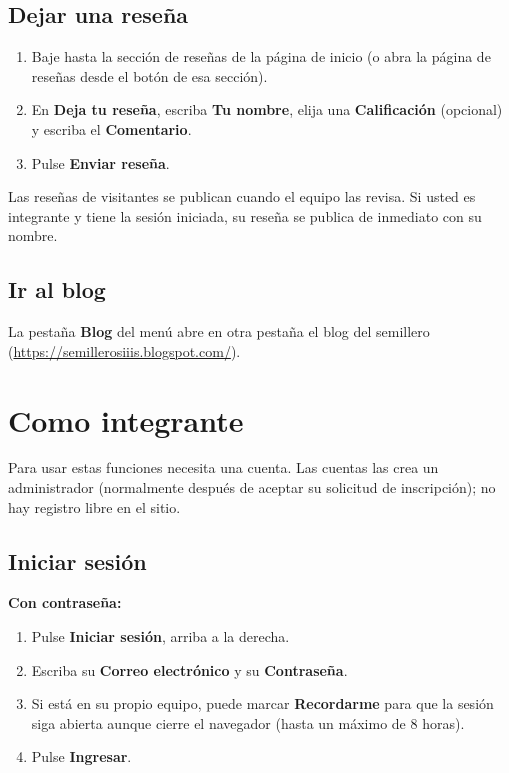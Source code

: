 \documentclass[11pt,a4paper]{article}
\newcommand{\boton}[1]{\textbf{\textcolor{siiisazul}{#1}}}
\begin{document}

\subsection{Dejar una rese\~na}
\begin{enumerate}
  \item Baje hasta la secci\'on de rese\~nas de la p\'agina de inicio (o abra la p\'agina de rese\~nas desde el bot\'on
    de esa secci\'on).
  \item En \boton{Deja tu rese\~na}, escriba \textbf{Tu nombre}, elija una \textbf{Calificaci\'on} (opcional) y escriba
    el \textbf{Comentario}.
  \item Pulse \boton{Enviar rese\~na}.
\end{enumerate}
Las rese\~nas de visitantes se publican cuando el equipo las revisa. Si usted es integrante y tiene la sesi\'on
iniciada, su rese\~na se publica de inmediato con su nombre.


\subsection{Ir al blog}
La pesta\~na \boton{Blog} del men\'u abre en otra pesta\~na el blog del semillero (\url{https://semillerosiiis.blogspot.com/}).

\section{Como integrante}

Para usar estas funciones necesita una cuenta. Las cuentas las crea un administrador (normalmente despu\'es de aceptar
su solicitud de inscripci\'on); no hay registro libre en el sitio.

\subsection{Iniciar sesi\'on}
\textbf{Con contrase\~na:}
\begin{enumerate}
  \item Pulse \boton{Iniciar sesi\'on}, arriba a la derecha.
  \item Escriba su \textbf{Correo electr\'onico} y su \textbf{Contrase\~na}.
  \item Si est\'a en su propio equipo, puede marcar \boton{Recordarme} para que la sesi\'on siga abierta aunque cierre
    el navegador (hasta un m\'aximo de 8 horas).
  \item Pulse \boton{Ingresar}.
\end{enumerate}
\end{document}
